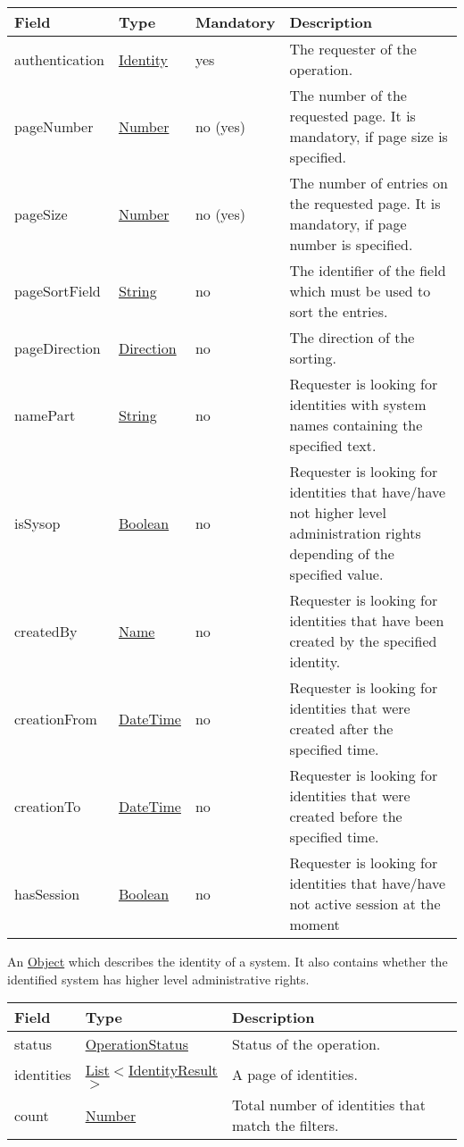 \documentclass[a4paper]{arrowhead}
\newcommand{\pref}[1]{{\textcolor{ArrowheadGrey}{\hyperref[sec:model:primitives:#1]{#1}}}}
\begin{document}
\begin{table}[ht!]
\begin{tabularx}{\textwidth}{| p{4.3cm} | p{4.8cm} | p{2cm} | X |} \hline
\rowcolor{gray!33} Field & Type & Mandatory & Description \\ \hline
authentication & \hyperref[sec:model:Identity]{Identity} & yes & The requester of the operation. \\ \hline
pageNumber & \pref{Number} & no (yes) & The number of the requested page. It is mandatory, if page size is specified. \\ \hline
pageSize & \pref{Number} & no (yes) & The number of entries on the requested page. It is mandatory, if page number is specified. \\ \hline
pageSortField & \pref{String} & no & The identifier of the field which must be used to sort the entries. \\ \hline
pageDirection & \pref{Direction} & no & The direction of the sorting. \\ \hline
namePart &  \pref{String} & no & Requester is looking for identities with system names containing the specified text. \\ \hline
isSysop & \pref{Boolean} & no & Requester is looking for identities that have/have not higher level administration rights depending of the specified value. \\ \hline
createdBy & \pref{Name} & no & Requester is looking for identities that have been created by the specified identity. \\ \hline
creationFrom &  \pref{DateTime} & no & Requester is looking for identities that were created after the specified time. \\ \hline
creationTo &  \pref{DateTime} & no & Requester is looking for identities that were created before the specified time. \\ \hline
hasSession & \pref{Boolean} & no & Requester is looking for identities that have/have not active session at the moment \\ \hline
\end{tabularx}
\end{table}


An \pref{Object} which describes the identity of a system. It also contains whether the identified system has higher level administrative rights.


\begin{table}[ht!]
\begin{tabularx}{\textwidth}{| p{2.5cm} | p{3.2cm} | X |} \hline
\rowcolor{gray!33} Field & Type      & Description \\ \hline
status & \pref{OperationStatus} & Status of the operation. \\ \hline
identities & \pref{List}$<$\hyperref[sec:model:IdentityResult]{IdentityResult}$>$ & A page of identities. \\ \hline
count & \pref{Number} & Total number of identities that match the filters. \\ \hline
\end{tabularx}
\end{table}
\end{document}
